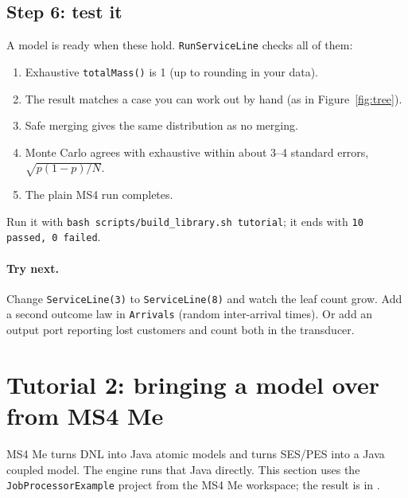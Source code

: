 \documentclass[11pt]{article}
\newcommand{\code}[1]{\texttt{#1}}
\begin{document}
\subsection{Step 6: test it}
A model is ready when these hold. \code{RunServiceLine} checks all of them:
\begin{enumerate}
\item Exhaustive \code{totalMass()} is 1 (up to rounding in your data).
\item The result matches a case you can work out by hand (as in Figure~\ref{fig:tree}).
\item Safe merging gives the same distribution as no merging.
\item Monte Carlo agrees with exhaustive within about 3--4 standard errors, $\sqrt{p(1-p)/N}$.
\item The plain MS4 run completes.
\end{enumerate}
Run it with \code{bash scripts/build\_library.sh tutorial}; it ends with \code{10 passed, 0 failed}.

\paragraph{Try next.} Change \code{ServiceLine(3)} to \code{ServiceLine(8)} and watch the leaf count grow. Add a
second outcome law in \code{Arrivals} (random inter-arrival times). Or add an output port reporting lost customers
and count both in the transducer.

\section{Tutorial 2: bringing a model over from MS4 Me}
\label{sec:import}

MS4 Me turns DNL into Java atomic models and turns SES/PES into a Java coupled model. The engine runs that Java
directly. This section uses the \code{JobProcessorExample} project from the MS4 Me workspace; the result is in
.
\end{document}
